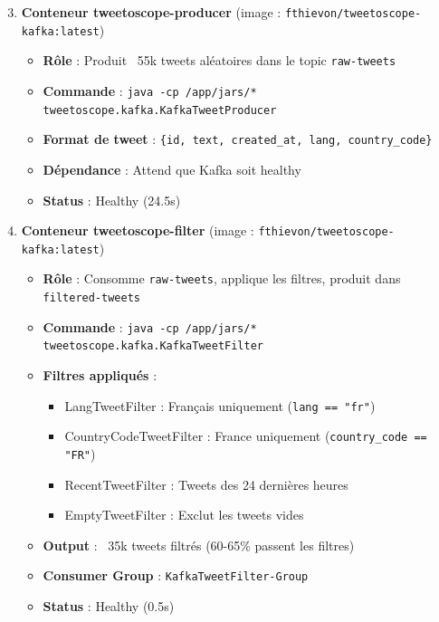 \documentclass[10pt,a4paper]{article}
\begin{document}
\begin{enumerate}
    \setcounter{enumi}{2}
    \item \textbf{Conteneur tweetoscope-producer} (image : \texttt{fthievon/tweetoscope-kafka:latest})
    \begin{itemize}
        \item \textbf{Rôle} : Produit ~55k tweets aléatoires dans le topic \texttt{raw-tweets}
        \item \textbf{Commande} : \texttt{java -cp /app/jars/* tweetoscope.kafka.KafkaTweetProducer}
        \item \textbf{Format de tweet} : \texttt{\{id, text, created\_at, lang, country\_code\}}
        \item \textbf{Dépendance} : Attend que Kafka soit healthy
        \item \textbf{Status} : Healthy (24.5s)
    \end{itemize}

    \item \textbf{Conteneur tweetoscope-filter} (image : \texttt{fthievon/tweetoscope-kafka:latest})
    \begin{itemize}
        \item \textbf{Rôle} : Consomme \texttt{raw-tweets}, applique les filtres, produit dans \texttt{filtered-tweets}
        \item \textbf{Commande} : \texttt{java -cp /app/jars/* tweetoscope.kafka.KafkaTweetFilter}
        \item \textbf{Filtres appliqués} :
        \begin{itemize}
            \item LangTweetFilter : Français uniquement (\texttt{lang == "fr"})
            \item CountryCodeTweetFilter : France uniquement (\texttt{country\_code == "FR"})
            \item RecentTweetFilter : Tweets des 24 dernières heures
            \item EmptyTweetFilter : Exclut les tweets vides
        \end{itemize}
        \item \textbf{Output} : ~35k tweets filtrés (60-65\% passent les filtres)
        \item \textbf{Consumer Group} : \texttt{KafkaTweetFilter-Group}
        \item \textbf{Status} : Healthy (0.5s)
    \end{itemize}


\end{enumerate}
\end{document}
